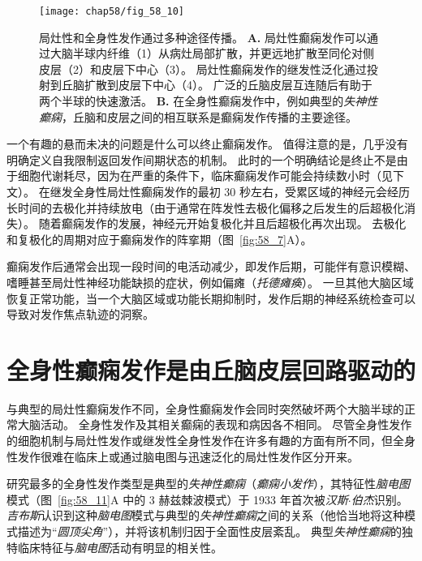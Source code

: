 \begin{figure}[htbp]
	\centering
	\texttt{[image: chap58/fig\_58\_10]}
	\caption{局灶性和全身性发作通过多种途径传播\cite{lothman1993pathophysiology}。
		\textbf{A.} 局灶性癫痫发作可以通过大脑半球内纤维（1）从病灶局部扩散，并更远地扩散至同伦对侧皮层（2）和皮层下中心（3）。
		局灶性癫痫发作的继发性泛化通过投射到丘脑扩散到皮层下中心（4）。
		广泛的丘脑皮层互连随后有助于两个半球的快速激活。
		\textbf{B.} 在全身性癫痫发作中，例如典型的\textit{失神性癫痫}，丘脑和皮层之间的相互联系是癫痫发作传播的主要途径。}
	\label{fig:58_10}
\end{figure}


一个有趣的悬而未决的问题是什么可以终止癫痫发作。
值得注意的是，几乎没有明确定义自我限制返回发作间期状态的机制。
此时的一个明确结论是终止不是由于细胞代谢耗尽，因为在严重的条件下，临床癫痫发作可能会持续数小时（见下文）。
在继发全身性局灶性癫痫发作的最初 30 秒左右，受累区域的神经元会经历长时间的去极化并持续放电（由于通常在阵发性去极化偏移之后发生的后超极化消失）。
随着癫痫发作的发展，神经元开始复极化并且后超极化再次出现。
去极化和复极化的周期对应于癫痫发作的阵挛期（图~\ref{fig:58_7}A）。


癫痫发作后通常会出现一段时间的电活动减少，即发作后期，可能伴有意识模糊、嗜睡甚至局灶性神经功能缺损的症状，例如偏瘫（\textit{托德瘫痪}）。
一旦其他大脑区域恢复正常功能，当一个大脑区域或功能长期抑制时，发作后期的神经系统检查可以导致对发作焦点轨迹的洞察。



\section{全身性癫痫发作是由丘脑皮层回路驱动的}

与典型的局灶性癫痫发作不同，全身性癫痫发作会同时突然破坏两个大脑半球的正常大脑活动。
全身性发作及其相关癫痫的表现和病因各不相同。
尽管全身性发作的细胞机制与局灶性发作或继发性全身性发作在许多有趣的方面有所不同，但全身性发作很难在临床上或通过脑电图与迅速泛化的局灶性发作区分开来。


研究最多的全身性发作类型是典型的\textit{失神性癫痫}（\textit{癫痫小发作}），其特征性\textit{脑电图}模式（图~\ref{fig:58_11}A 中的 3 赫兹棘波模式）于 1933 年首次被\textit{汉斯$\cdot$伯杰}识别。
\textit{吉布斯}认识到这种\textit{脑电图}模式与典型的\textit{失神性癫痫}之间的关系（他恰当地将这种模式描述为“\textit{圆顶尖角}”），并将该机制归因于全面性皮层紊乱。
典型\textit{失神性癫痫}的独特临床特征与\textit{脑电图}活动有明显的相关性。


